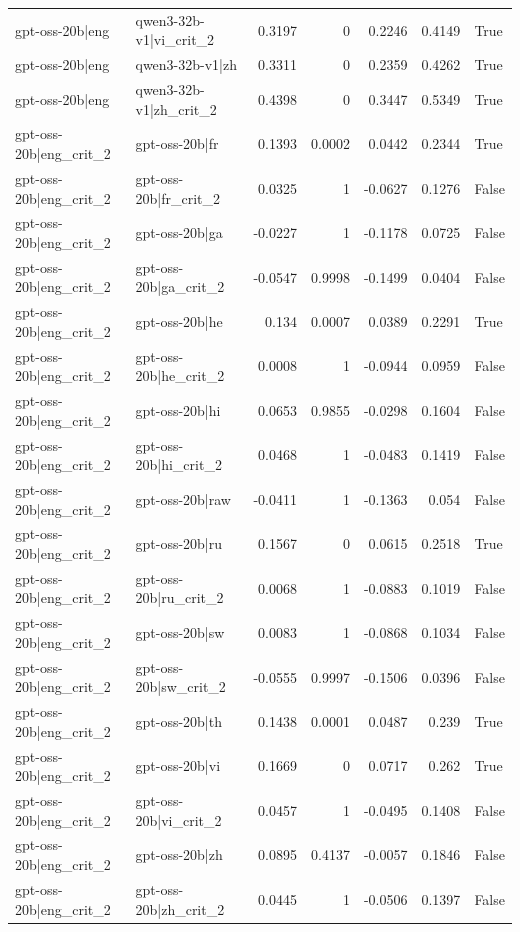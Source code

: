 \begin{table}
\begin{tabular}{l l r r r r l}
gpt-oss-20b|eng & qwen3-32b-v1|vi_crit_2 & 0.3197 & 0 & 0.2246 & 0.4149 & True \\
gpt-oss-20b|eng & qwen3-32b-v1|zh & 0.3311 & 0 & 0.2359 & 0.4262 & True \\
gpt-oss-20b|eng & qwen3-32b-v1|zh_crit_2 & 0.4398 & 0 & 0.3447 & 0.5349 & True \\
gpt-oss-20b|eng_crit_2 & gpt-oss-20b|fr & 0.1393 & 0.0002 & 0.0442 & 0.2344 & True \\
gpt-oss-20b|eng_crit_2 & gpt-oss-20b|fr_crit_2 & 0.0325 & 1 & -0.0627 & 0.1276 & False \\
gpt-oss-20b|eng_crit_2 & gpt-oss-20b|ga & -0.0227 & 1 & -0.1178 & 0.0725 & False \\
gpt-oss-20b|eng_crit_2 & gpt-oss-20b|ga_crit_2 & -0.0547 & 0.9998 & -0.1499 & 0.0404 & False \\
gpt-oss-20b|eng_crit_2 & gpt-oss-20b|he & 0.134 & 0.0007 & 0.0389 & 0.2291 & True \\
gpt-oss-20b|eng_crit_2 & gpt-oss-20b|he_crit_2 & 0.0008 & 1 & -0.0944 & 0.0959 & False \\
gpt-oss-20b|eng_crit_2 & gpt-oss-20b|hi & 0.0653 & 0.9855 & -0.0298 & 0.1604 & False \\
gpt-oss-20b|eng_crit_2 & gpt-oss-20b|hi_crit_2 & 0.0468 & 1 & -0.0483 & 0.1419 & False \\
gpt-oss-20b|eng_crit_2 & gpt-oss-20b|raw & -0.0411 & 1 & -0.1363 & 0.054 & False \\
gpt-oss-20b|eng_crit_2 & gpt-oss-20b|ru & 0.1567 & 0 & 0.0615 & 0.2518 & True \\
gpt-oss-20b|eng_crit_2 & gpt-oss-20b|ru_crit_2 & 0.0068 & 1 & -0.0883 & 0.1019 & False \\
gpt-oss-20b|eng_crit_2 & gpt-oss-20b|sw & 0.0083 & 1 & -0.0868 & 0.1034 & False \\
gpt-oss-20b|eng_crit_2 & gpt-oss-20b|sw_crit_2 & -0.0555 & 0.9997 & -0.1506 & 0.0396 & False \\
gpt-oss-20b|eng_crit_2 & gpt-oss-20b|th & 0.1438 & 0.0001 & 0.0487 & 0.239 & True \\
gpt-oss-20b|eng_crit_2 & gpt-oss-20b|vi & 0.1669 & 0 & 0.0717 & 0.262 & True \\
gpt-oss-20b|eng_crit_2 & gpt-oss-20b|vi_crit_2 & 0.0457 & 1 & -0.0495 & 0.1408 & False \\
gpt-oss-20b|eng_crit_2 & gpt-oss-20b|zh & 0.0895 & 0.4137 & -0.0057 & 0.1846 & False \\
gpt-oss-20b|eng_crit_2 & gpt-oss-20b|zh_crit_2 & 0.0445 & 1 & -0.0506 & 0.1397 & False \\

\end{tabular}
\end{table}
